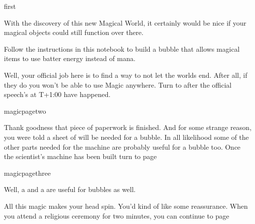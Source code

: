 \documentclass[greennotebook]{guildcamp3} %
\begin{document}
\startnotebook{\nMagicBubble{}}


\begin{page}{first}

With the discovery of this new Magical World, it certainly would be nice if your magical objects could still function over there.  

Follow the instructions in this notebook to build a bubble that allows magical items to use batter energy instead of mana. 

Well, your official job here is to find a way to not let the worlds end. After all, if they do you won't be able to use Magic anywhere. Turn to  after the official speech's at T+1:00 have happened.  
\end{page}



\begin{page}{magicpagetwo}

Thank goodness that piece of paperwork is finished. And for some strange reason, you were told a sheet of \iScrapMetal{} will be needed for a bubble. In all likelihood some of the other parts needed for the machine are probably useful for a bubble too. Once the scientist's machine has been built turn to page 

\end{page}

\begin{page}{magicpagethree}

Well, a \iStardust{} and a \iWerewolfFang{} are useful for bubbles as well. 

All this magic makes your head spin. You'd kind of like some reassurance. When you attend a religious ceremony for two minutes, you can continue to page 

	
\end{page}
\end{document}
